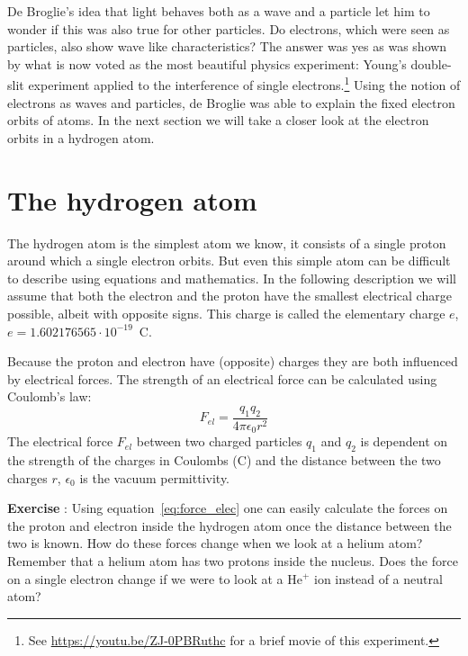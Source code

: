 De Broglie's idea that light behaves both as a wave and a particle let him to wonder if this was also true for other particles. Do electrons, which were seen as particles, also show wave like characteristics? The answer was yes as was shown by what is now voted as the most beautiful physics experiment: Young's double-slit experiment applied to the interference of single electrons.\footnote{See \url{https://youtu.be/ZJ-0PBRuthc} for a brief movie of this experiment.} Using the notion of electrons as waves and particles, de Broglie was able to explain the fixed electron orbits of atoms. In the next section we will take a closer look at the electron orbits in a hydrogen atom.

\section{The hydrogen atom}
The hydrogen atom is the simplest atom we know, it consists of a single proton around which a single electron orbits. But even this simple atom can be difficult to describe using equations and mathematics. In the following description we will assume that both the electron and the proton have the smallest electrical charge possible, albeit with opposite signs. This charge is called the elementary charge $e$, $e=1.602176565 \cdot 10^{-19}$~C.

Because the proton and electron have (opposite) charges they are both influenced by electrical forces. The strength of an electrical force can be calculated using Coulomb's law:
\begin{equation}
F_{el} = \frac{q_1 q_2}{4 \pi \epsilon_0 r^2} \label{eq:force_elec} 
\end{equation}
The electrical force $F_{el}$ between two charged particles $q_1$ and $q_2$ is dependent on the strength of the charges in Coulombs (C) and the distance between the two charges $r$, $\epsilon_0$ is the vacuum permittivity. 

\begin{shaded} \textbf{Exercise \theExercise {}} : Using equation~\ref{eq:force_elec} one can easily calculate the forces on the proton and electron inside the hydrogen atom once the distance between the two is known. How do these forces change when we look at a helium atom? Remember that a helium atom has two protons inside the nucleus. Does the force on a single electron change if we were to look at a He$^+$ ion instead of a neutral atom?\end{shaded}

